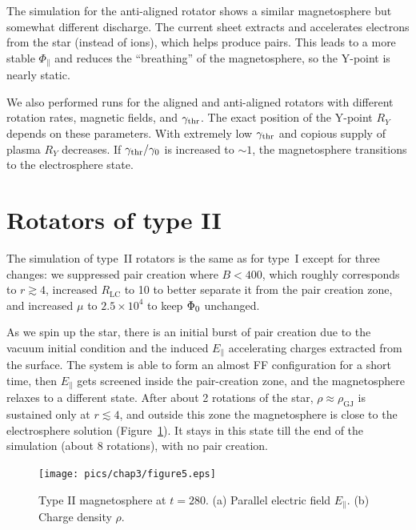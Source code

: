 The simulation for the anti-aligned rotator shows a similar magnetosphere
but somewhat different discharge.
The current sheet extracts
and accelerates electrons from the star
(instead of ions), which helps
produce pairs. This leads to a more stable $\Phi_\parallel$
and reduces the ``breathing'' of the magnetosphere, so the Y-point is nearly static.

We also performed runs for the aligned and anti-aligned rotators with
different rotation rates, magnetic fields, and $\gamma_{\rm thr}$. The exact
position of the Y-point $R_Y$ depends on these parameters.
With extremely low $\gamma_{\rm thr}$ and copious supply of plasma $R_Y$ decreases.
If $\gamma_{\rm thr}/\gamma_0$ is increased to $\sim 1$,
the magnetosphere transitions to the electrosphere state.


\section{Rotators of type II}

The simulation of type~II rotators is the same as for type~I except for three changes:
we suppressed pair creation where $B<400$, which roughly corresponds to $r\gtrsim 4$,
increased $R_\mathrm{LC}$ to 10 to better separate it from the pair creation zone,
and increased $\mu$ to $2.5\times 10^4$ to keep $\Phi_0$ unchanged.


As we spin up the star, there is an initial burst of pair creation due to the
vacuum initial condition and the induced $E_\parallel$ accelerating
charges extracted from the surface. The system is able to form an almost FF
configuration for a short time, then $E_\parallel$ gets screened inside the
pair-creation zone, and the magnetosphere relaxes to a different state.
After about 2 rotations of the star, $\rho\approx\rho_\mathrm{GJ}$ is sustained only at $r\lesssim 4$,
and outside this zone the magnetosphere is close to the electrosphere solution
(Figure~\ref{fig:type2}). It stays in this state till the end of the simulation
(about 8 rotations), with no pair creation.

\begin{figure}[t]
    \centering
    \texttt{[image: pics/chap3/figure5.eps]}
    \caption{\small
    Type II magnetosphere at $t=280$.
    (a) Parallel electric field $E_{\parallel}$.
    (b) Charge density $\rho$.
    }
   \label{fig:type2}
\end{figure}

